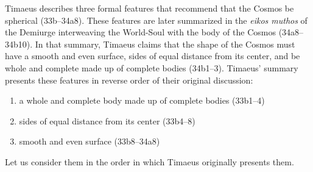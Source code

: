 Timaeus describes three formal features that recommend that the Cosmos be spherical (33b--34a8). These features are later summarized in the \emph{eikos muthos} of the Demiurge interweaving the World-Soul with the body of the Cosmos (34a8--34b10). In that summary, Timaeus claims that the shape of the Cosmos must have a smooth and even surface, sides of equal distance from its center, and be whole and complete made up of complete bodies (34b1--3). Timaeus' summary presents these features in reverse order of their original discussion:
\begin{enumerate}[(1)]
	\item a whole and complete body made up of complete bodies (33b1--4)
	\item sides of equal distance from its center (33b4--8)
	\item smooth and even surface (33b8--34a8)
\end{enumerate}
Let us consider them in the order in which Timaeus originally presents them.

